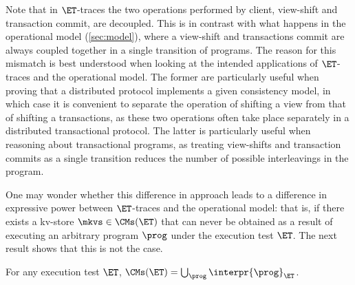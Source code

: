 Note that in $\ET$-traces the two operations performed by client, view-shift and 
transaction commit, are decoupled. This is in contrast with what happens in the operational model (\cref{sec:model}), 
where a view-shift and transactions commit are always coupled together in a single transition of programs. 
The reason for this mismatch is best understood when looking at the intended applications of 
$\ET$-traces and the operational model. The former are particularly useful when proving that a distributed 
protocol implements a given consistency model, in which case it is convenient to separate the operation of shifting a view from that of shifting a transactions, 
as these two operations often take place separately in a distributed transactional protocol. The latter is particularly useful when reasoning about transactional 
programs, as treating view-shifts and transaction commits as a single transition reduces the number of possible interleavings in the program.

One may wonder whether this difference in approach leads to a difference in expressive power between $\ET$-traces 
and the operational model: that is, if there exists a kv-store $\mkvs \in \CMs(\ET)$ that can never be obtained as a 
result of executing an arbitrary program $\prog$ under the execution test $\ET$. The next result shows that 
this is not the case.
%

\begin{theorem}
For any execution test $\ET$, $\CMs(\ET) = \bigcup_{\prog} \interpr{\prog}_{\ET}$.
\end{theorem}

